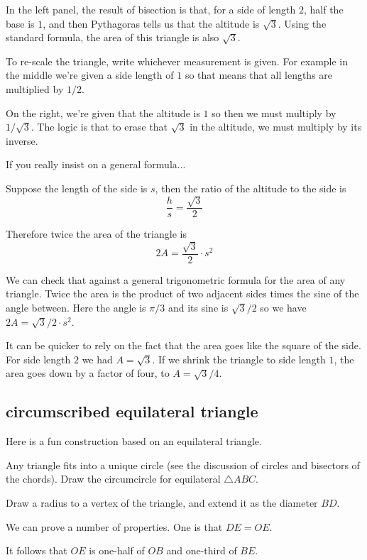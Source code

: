 \documentclass[11pt, oneside]{article}
\begin{document}
In the left panel, the result of bisection is that, for a side of length $2$, half the base is $1$, and then Pythagoras tells us that the altitude is $\sqrt{3}$.  Using the standard formula, the area of this triangle is also $\sqrt{3}$.

To re-scale the triangle, write whichever measurement is given.  For example in the middle we're given a side length of $1$ so that means that all lengths are multiplied by $1/2$.  

On the right, we're given that the altitude is $1$ so then we must multiply by $1/\sqrt{3}$.  The logic is that to erase that $\sqrt{3}$ in the altitude, we must multiply by its inverse.

If you really insist on a general formula...

Suppose the length of the side is $s$, then the ratio of the altitude to the side is
\[ \frac{h}{s} = \frac{\sqrt{3}}{2} \]

Therefore twice the area of the triangle is
\[ 2A = \frac{\sqrt{3}}{2} \cdot s^2 \]

We can check that against a general trigonometric formula for the area of any triangle.  Twice the area is the product of two adjacent sides times the sine of the angle between.  Here the angle is $\pi/3$ and its sine is $\sqrt{3}/2$ so we have $2A = \sqrt{3}/2 \cdot s^2$.

It can be quicker to rely on the fact that the area goes like the square of the side.  For side length $2$ we had $A = \sqrt{3}$.  If we shrink the triangle to side length $1$, the area goes down by a factor of four, to $A = \sqrt{3}/4$.

\newpage

\subsection*{circumscribed equilateral triangle}

Here is a fun construction based on an equilateral triangle.  

Any triangle fits into a unique circle (see the discussion of circles and bisectors of the chords).  Draw the circumcircle for equilateral $\triangle ABC$.

Draw a radius to a vertex of the triangle, and extend it as the diameter $BD$.

We can prove a number of properties.  One is that $DE = OE$.  

It follows that $OE$ is one-half of $OB$ and one-third of $BE$.
\end{document}
